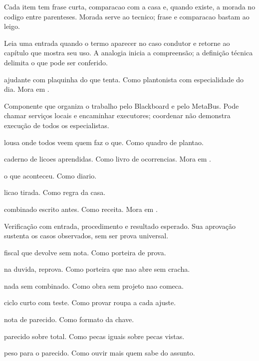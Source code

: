\begin{descricao}
Cada item tem frase curta, comparacao com a casa e, quando existe, a morada no codigo entre parenteses. Morada serve ao tecnico; frase e comparacao bastam ao leigo.
\end{descricao}

\begin{descricao}
Leia uma entrada quando o termo aparecer no caso condutor e retorne ao capítulo que mostra seu uso. A analogia inicia a compreensão; a definição técnica delimita o que pode ser conferido.

\begin{description}[style=nextline,leftmargin=1.3em,itemsep=5pt]
\item[Agente.] ajudante com plaquinha do que tenta. Como plantonista com especialidade do dia. Mora em .
\item[Orquestrador.] Componente que organiza o trabalho pelo Blackboard e pelo MetaBus. Pode chamar serviços locais e encaminhar executores; coordenar não demonstra execução de todos os especialistas.
\item[Blackboard.] lousa onde todos veem quem faz o que. Como quadro de plantao.
\item[MetaBus.] caderno de licoes aprendidas. Como livro de ocorrencias. Mora em .
\item[Memória episódica.] o que aconteceu. Como diario.
\item[Memória semântica.] licao tirada. Como regra da casa.
\item[Spec.] combinado escrito antes. Como receita. Mora em .
\item[Teste.] Verificação com entrada, procedimento e resultado esperado. Sua aprovação sustenta os casos observados, sem ser prova universal.
\item[Gate.] fiscal que devolve sem nota. Como porteira de prova.
\item[Fail-closed.] na duvida, reprova. Como porteira que nao abre sem cracha.
\item[SDD.] nada sem combinado. Como obra sem projeto nao comeca.
\item[TDD.] ciclo curto com teste. Como provar roupa a cada ajuste.
\item[Escore.] nota de parecido. Como formato da chave.
\item[Jaccard.] parecido sobre total. Como pecas iguais sobre pecas vistas.
\item[Atenção.] peso para o parecido. Como ouvir mais quem sabe do assunto.

\end{description}
\end{descricao}
